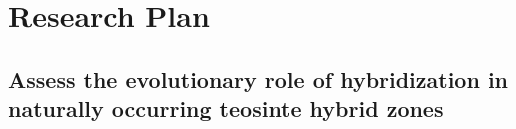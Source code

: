 \section*{Research Plan}


\subsection{Assess the evolutionary role of hybridization in naturally occurring teosinte hybrid zones}
\label{ss:hybrids}

